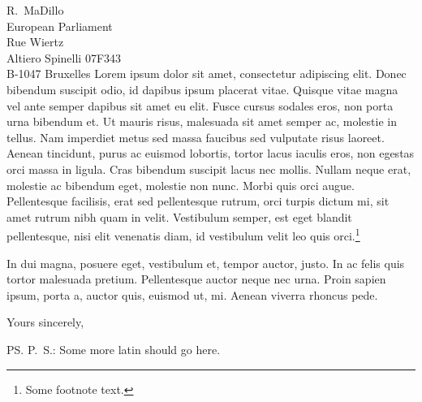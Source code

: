 \documentclass[a4paper,12pt]{letter}
\newcommand{\fn}[1]{\footnote{#1}}
\begin{document}
\begin{letter}{
	R.\ MaDillo\\
	European Parliament\\
	Rue Wiertz\\
	Altiero Spinelli 07F343\\
	B-1047 Bruxelles 
}
	Lorem ipsum dolor sit amet, consectetur adipiscing elit. Donec bibendum 
	suscipit odio, id dapibus ipsum placerat vitae. Quisque vitae magna vel ante 
	semper dapibus sit amet eu elit. Fusce cursus sodales eros, non porta urna 
	bibendum et. Ut mauris risus, malesuada sit amet semper ac, molestie in 
	tellus. Nam imperdiet metus sed massa faucibus sed vulputate risus laoreet. 
	Aenean tincidunt, purus ac euismod lobortis, tortor lacus iaculis eros, non 
	egestas orci massa in ligula. Cras bibendum suscipit lacus nec mollis. Nullam 
	neque erat, molestie ac bibendum eget, molestie non nunc. Morbi quis orci 
	augue. Pellentesque facilisis, erat sed pellentesque rutrum, orci turpis 
	dictum mi, sit amet rutrum nibh quam in velit. Vestibulum semper, est eget 
	blandit pellentesque, nisi elit venenatis diam, id vestibulum velit leo quis 
	orci.\fn{Some footnote text.} 

	In dui magna, posuere eget, vestibulum et, tempor auctor, justo. In ac felis 
	quis tortor malesuada pretium. Pellentesque auctor neque nec urna. Proin 
	sapien ipsum, porta a, auctor quis, euismod ut, mi. Aenean viverra rhoncus 
	pede. 

%
%

%
%
\closing{Yours sincerely,} %
\ps{P.\ S.: Some more latin should go here.} %

%
%
\end{letter}
\end{document}
